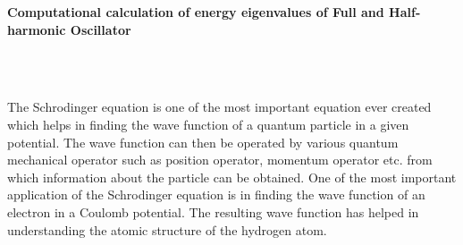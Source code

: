 \documentclass{article}
\begin{document}
\begin{center}{\Huge \bf Computational calculation of energy eigenvalues of Full and Half-harmonic  Oscillator} \end{center}\\
\vspace*{0.5cm}{\huge \bf 1 Introduction} \\ \par
\Large The Schrodinger equation is one of the most important equation ever created which helps in finding the wave function of a quantum particle in a given potential. The wave function can then be operated by various quantum mechanical operator such as position operator, momentum operator etc. from which information about the particle can be obtained. One of the most important application of the Schrodinger equation is in finding the wave function of an electron in a Coulomb potential. The resulting wave function has helped in understanding the atomic structure of the hydrogen atom. \par
\end{document}
